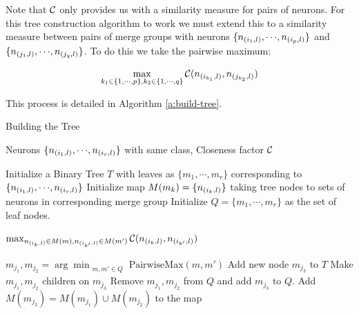 Note that $\mathcal{C}$ only provides us
with a similarity measure for pairs of neurons. For this tree construction
algorithm to work we must extend this to a similarity
measure between pairs of merge groups with neurons
$\{n_{(i_1,l)}, {\cdots}, n_{(i_p,l)}\}$ and $\{n_{(j_1,l)}, {\cdots},
n_{(j_q,l)}\}$. To do this we take the pairwise maximum: 

\begin{equation*}
\begin{aligned}
    \max_{k_1 \in \{1, {\cdots}, p\},
    k_2 \in \{1, {\cdots}, q\}} \mathcal{C}( n_{(i_{k_1},l)}, n_{(j_{k_2},l)} )
\end{aligned}
\end{equation*}


This process is detailed in Algorithm \ref{a:build-tree}.

\begin{algorithm}[H]
\caption{Building the Tree}
\label{a:build-tree}
\begin{algorithmic}[1]

    \Require Neurons $\{n_{(i_1,l)}, {\cdots}, n_{(i_r,l)}\}$ with same class,
    Closeness factor $\mathcal{C}$
    
    \State Initialize a Binary Tree $T$ with leaves as
        $\{m_1, {\cdots}, m_r\}$ corresponding to $\{ n_{(i_1,l)}, {\cdots},
        n_{(i_r,l)} \}$
    \State Initialize map $M(m_k) = \{ n_{(i_k,l)} \}$ taking tree nodes to sets
        of neurons in corresponding merge group
    \State Initialize $Q=\{m_1, {\cdots}, m_r\}$ as the set of leaf nodes.

        
            \Return $\max_{n_{(i_{k},l)} \in M(m), n_{(i_{k'},l)} \in M(m')} 
                \mathcal{C}( n_{(i_{k},l)}, n_{(i_{k'},l)} )$

    \EndFunction

        \State $m_{j_1}, m_{j_2} = \arg\min_{\substack{m, m' \in Q}} 
            \text{PairwiseMax}(m, m')$
        \State Add new node $m_{j_3}$ to $T$ 
        \State Make $m_{j_1}, m_{j_2}$ children on $m_{j_3}$
        \State Remove $m_{j_1}, m_{j_2}$ from $Q$ and add $m_{j_3}$ to $Q$.
        \State Add $M(m_{j_3}) = M(m_{j_1}) \cup M(m_{j_2})$ to the map
    \EndWhile
\end{algorithmic}
\end{algorithm}

